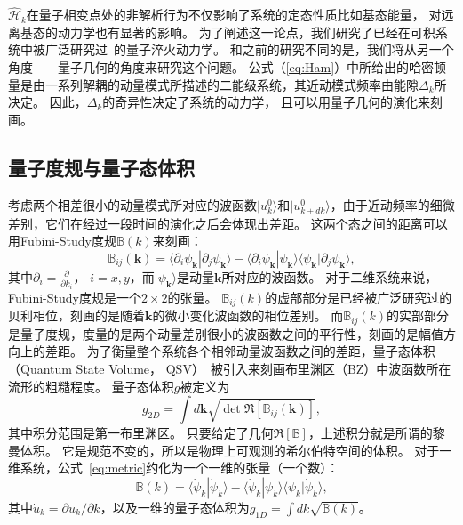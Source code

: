 			$\hat{\mathcal{H}}_k$在量子相变点处的非解析行为不仅影响了系统的定态性质比如基态能量， 对远离基态的动力学也有显著的影响。
			为了阐述这一论点，我们研究了已经在可积系统中被广泛研究过~\cite{Barthel2008,Calabrese2011,Mitra2018}的量子淬火动力学。
			和之前的研究不同的是，我们将从另一个角度——量子几何的角度来研究这个问题。
			公式（\eqref{eq:Ham}）中所给出的哈密顿量是由一系列解耦的动量模式所描述的二能级系统，其近动模式频率由能隙$\Delta_k$所决定。
			因此，$\Delta_k$的奇异性决定了系统的动力学， 且可以用量子几何的演化来刻画。
		
		\subsection{量子度规与量子态体积}
		
			考虑两个相差很小的动量模式所对应的波函数$|u^0_k\rangle$和$|u^0_{k+dk}\rangle$，由于近动频率的细微差别，它们在经过一段时间的演化之后会体现出差距。
			这两个态之间的距离可以用Fubini-Study度规$\mathbb{B}(k)$来刻画：
			\begin{equation}
				\mathbb{B}_{ij}(\mathbf{k})=\langle\partial_i \psi_\mathbf{k} |\partial_j \psi_\mathbf{k}\rangle-\langle\partial_i \psi_\mathbf{k} |\psi_\mathbf{k}\rangle \langle \psi_\mathbf{k}|\partial_j \psi_\mathbf{k}\rangle, \label{eq:metric}
			\end{equation}
			其中$\partial_i=\frac{\partial}{\partial k_i}$， $i=x,y$，而$|\psi_\mathbf{k}\rangle$是动量$\mathbf{k}$所对应的波函数。
			对于二维系统来说，Fubini-Study度规是一个$2\times2$的张量。
			$\mathbb{B}_{ij}(k)$的虚部部分是已经被广泛研究过的贝利相位，刻画的是随着$\mathbf{k}$的微小变化波函数的相位差别。
			而$\mathbb{B}_{ij}(k)$的实部部分是量子度规，度量的是两个动量差别很小的波函数之间的平行性，刻画的是幅值方向上的差距。
			为了衡量整个系统各个相邻动量波函数之间的差距，量子态体积（Quantum State Volume， QSV）~\cite{Ozawa20210}被引入来刻画布里渊区（BZ）中波函数所在流形的粗糙程度。
			量子态体积$g$被定义为
			\begin{equation} \label{eq:g_2D}
				g_{2D}=\int d\mathbf{k} \sqrt{\det\Re[\mathbb{B}_{ij}(\mathbf{k})]},
			\end{equation}
			其中积分范围是第一布里渊区。
			只要给定了几何$\Re[\mathbb{B}]$，上述积分就是所谓的黎曼体积。
			它是规范不变的，所以是物理上可观测的希尔伯特空间的体积。
			对于一维系统，公式~\eqref{eq:metric}约化为一个一维的张量（一个数）：
			\begin{equation}\label{eq:B_1D}
				\mathbb{B}(k)= \langle \dot{\psi}_k|\dot{\psi}_k\rangle-\langle \dot{\psi}_k|\psi_k\rangle \langle \psi_k|\dot{\psi}_k \rangle,
			\end{equation}
			其中$\dot{u}_k=\partial u_k/\partial k$，以及一维的量子态体积为$g_{1D}=\int dk \sqrt{\mathbb{B}(k)}$。

